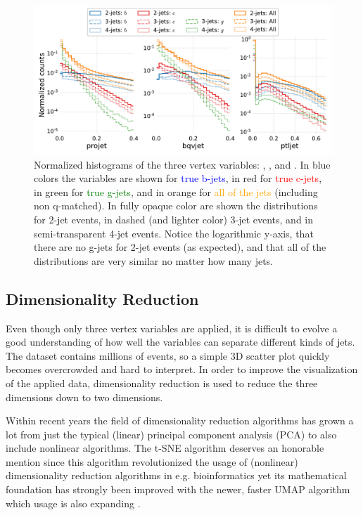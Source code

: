 \begin{figure}[h!]
  \centerfloat
  \includegraphics[width=1\textwidth, trim=10 10 5 5, clip]{figures/quarks/btagging_variables_hist-down_sample=1.00-ML_vars=vertex-selection=b-ejet_min=4-n_iter_RS_lgb=99-n_iter_RS_xgb=9-cdot_cut=0.90-version=19.pdf}
  \caption[Histograms of the Vertex Variables]
          {Normalized histograms of the three vertex variables: , , and . In blue colors the variables are shown for \textcolor{blue}{true b-jets}, in red for \textcolor{red}{true c-jets}, in green for \textcolor{green}{true g-jets}, and in orange for \textcolor{orange}{all of the jets} (including non q-matched). In fully opaque color are shown the distributions for 2-jet events, in dashed (and lighter color) 3-jet events, and in semi-transparent 4-jet events. Notice the logarithmic y-axis, that there are no g-jets for 2-jet events (as expected), and that all of the distributions are very similar no matter how many jets.
          } 
  \label{fig:q:vertex_variables}
\end{figure}

\FloatBarrier
\subsection{Dimensionality Reduction}

Even though only three vertex variables are applied, it is difficult to evolve a good understanding of how well the variables can separate different kinds of jets. The dataset contains millions of events, so a simple 3D scatter plot quickly becomes overcrowded and hard to interpret. In order to improve the visualization of the applied data, dimensionality reduction is used to reduce the three dimensions down to two dimensions. 

Within recent years the field of dimensionality reduction algorithms has grown a lot from just the typical (linear) principal component analysis (PCA) to also include nonlinear algorithms. The t-SNE algorithm \autocite{maatenVisualizingDataUsing2008} deserves an honorable mention since this algorithm revolutionized the usage of (nonlinear) dimensionality reduction algorithms in e.g. bioinformatics \citep{toghieshghiQuantitativeComparisonConventional2019, wallachProteinSmallmoleculeDatabase2009}  yet its mathematical foundation has strongly been improved with the newer, faster UMAP algorithm \autocite{mcinnesUMAPUniformManifold2018} which usage is also expanding \citep{bechtEvaluationUMAPAlternative2018, bechtDimensionalityReductionVisualizing2019, diaz-papkovichUMAPRevealsCryptic2019}. 


